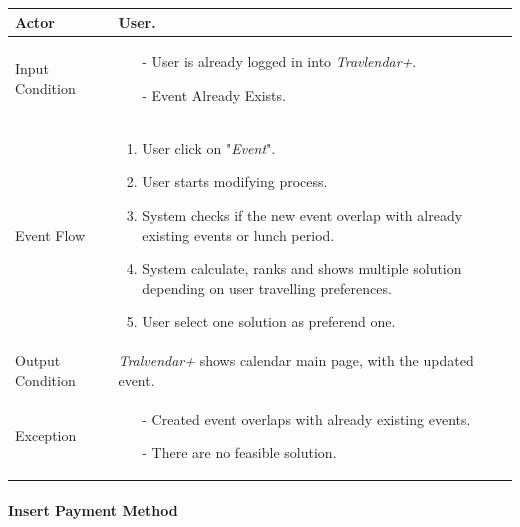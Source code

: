 		\begin{tabular}{| l | p{} | }
			\hline
			\hline
			Actor	&		User. \\
			\hline
			Input Condition		&		\begin{itemize}
													\item[-] User is already logged in into \textit{Travlendar+}.
													\item[-] Event Already Exists.
												\end{itemize} \\
			\hline
			Event Flow		&		\begin{enumerate}
												\item User click on "\textit{Event}".
												\item User starts modifying process.
												\item System checks if the new event overlap with already existing events or lunch period.
												\item	 System calculate, ranks and shows multiple solution depending on user travelling preferences.
												\item User select one solution as preferend one.
											\end{enumerate} \\
			\hline
			Output Condition		&		\textit{Tralvendar+} shows calendar main page, with the updated event. \\
			\hline		
			Exception		&		\begin{itemize}
											\item[-] Created event overlaps with already existing events.
											\item[-] There are no feasible solution.
										\end{itemize} \\
			\hline
			\hline
		\end{tabular}
		
		

	\paragraph{Insert Payment Method}
	
